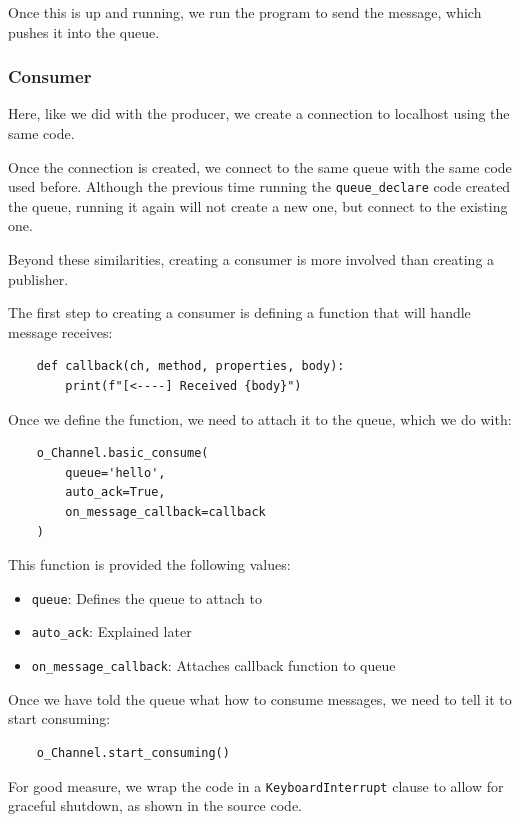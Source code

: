 \documentclass{article}
\begin{document}
Once this is up and running, we run the program to send the message, which pushes it into the queue.

\subsubsection{Consumer}

Here, like we did with the producer, we create a connection to localhost using the same code.

Once the connection is created, we connect to the same queue with the same code used before. Although the previous time running the \verb|queue_declare| code created the queue, running it again will not create a new one, but connect to the existing one.

Beyond these similarities, creating a consumer is more involved than creating a publisher. 

The first step to creating a consumer is defining a function that will handle message receives:

\begin{verbatim}
    def callback(ch, method, properties, body):
        print(f"[<----] Received {body}")
\end{verbatim}

Once we define the function, we need to attach it to the queue, which we do with:

\begin{verbatim}
    o_Channel.basic_consume(
        queue='hello',
        auto_ack=True,
        on_message_callback=callback
    )
\end{verbatim}

This function is provided the following values:

\begin{itemize}
    \item \verb|queue|: Defines the queue to attach to
    \item \verb|auto_ack|: Explained later
    \item \verb|on_message_callback|: Attaches callback function to queue
\end{itemize}

Once we have told the queue what how to consume messages, we need to tell it to start consuming:

\begin{verbatim}
    o_Channel.start_consuming()
\end{verbatim}

For good measure, we wrap the code in a \verb|KeyboardInterrupt| clause to allow for graceful shutdown, as shown in the source code.
\end{document}

